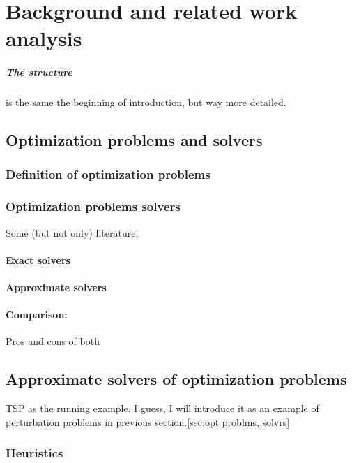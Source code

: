 \chapter{Background and related work analysis}\label{bg}
\paragraph{The structure} is the same the beginning of introduction, but way more detailed.  


\section{Optimization problems and solvers}\label{bg:opt problems and solvers}

\subsection{Definition of optimization problems}

\subsection{Optimization problems solvers}
Some (but not only) literature: \cite{bergstra2011algorithms}
\subsubsection{Exact solvers}
\subsubsection{Approximate solvers}
\subsubsection{Comparison:} Pros and cons of both \cite{hromkovivc2013algorithmics}


\section{Approximate solvers of optimization problems}
TSP as the running example. I guess, I will introduce it as an example of perturbation problems in previous section.\ref{sec:opt problms, solvrs}

\subsection{Heuristics}
